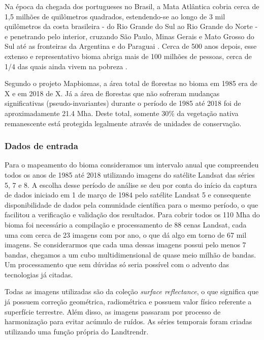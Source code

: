 Na época da chegada dos portugueses no Brasil, a Mata Atlântica cobria cerca de 1,5 milhões de quilômetros quadrados, estendendo-se ao longo de 3 mil quilômetros da costa brasileira - do Rio Grande do Sul ao Rio Grande do Norte - e penetrando pelo interior, cruzando São Paulo, Minas Gerais e Mato Grosso do Sul até as fronteiras da Argentina e do Paraguai \citep{scarano2014}. Cerca de 500 anos depois, esse extenso e representativo bioma abriga mais de 100 milhões de pessoas, cerca de 1/4 das quais ainda vivem na pobreza \citep{scarano2014}.

Segundo o projeto Mapbiomas, a área total de florestas no bioma em 1985 era de X e em 2018 de X. Já a área de florestas que não sofreram mudanças significativas (pseudo-invariantes) durante o período de 1985 até 2018 foi de aproximadamente 21.4 Mha. Deste total, somente  30\% da vegetação nativa remanescente está protegida legalmente através de unidades de conservação.


\subsubsection{Dados de entrada}
\hspace{13pt} Para o mapeamento do bioma consideramos um intervalo anual que compreendeu todos os anos de 1985 até 2018 utilizando imagens do satélite Landsat das séries 5, 7 e 8. A escolha desse período de análise se deu por conta do início da captura de dados iniciado em 1 de março de 1984 pelo satélite Landsat 5 e consequente disponibilidade de dados pela comunidade científica para o mesmo período, o que facilitou a verificação e validação dos resultados. Para cobrir todos os 110 Mha do bioma foi necessário a compilação e processamento de 88 cenas Landsat, cada uma com cerca de 23 imagens com por ano, o que dá algo em torno de 67 mil imagens. Se considerarmos que cada uma dessas imagens possui pelo menos 7 bandas, chegamos a um cubo multidimensional de quase meio milhão de bandas. Um processamento que sem dúvidas só seria possível com o advento das tecnologias já citadas.

Todas as imagens utilizadas são da coleção \emph{surface reflectance}, o que significa que já possuem correção geométrica, radiométrica e possuem valor físico referente a superfície terrestre. Além disso, as imagens passaram por processo de harmonização para evitar acúmulo de ruídos. As séries temporais foram criadas utilizando uma função própria do Landtrendr.

